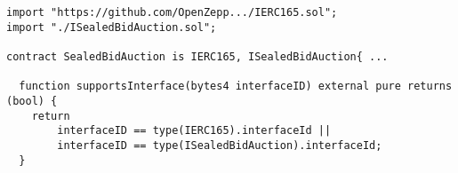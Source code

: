 \begin{lstlisting}[language=Solidity]
import "https://github.com/OpenZepp.../IERC165.sol";
import "./ISealedBidAuction.sol";

contract SealedBidAuction is IERC165, ISealedBidAuction{ ...

  function supportsInterface(bytes4 interfaceID) external pure returns (bool) {
    return
        interfaceID == type(IERC165).interfaceId ||
        interfaceID == type(ISealedBidAuction).interfaceId;
  }
\end{lstlisting}